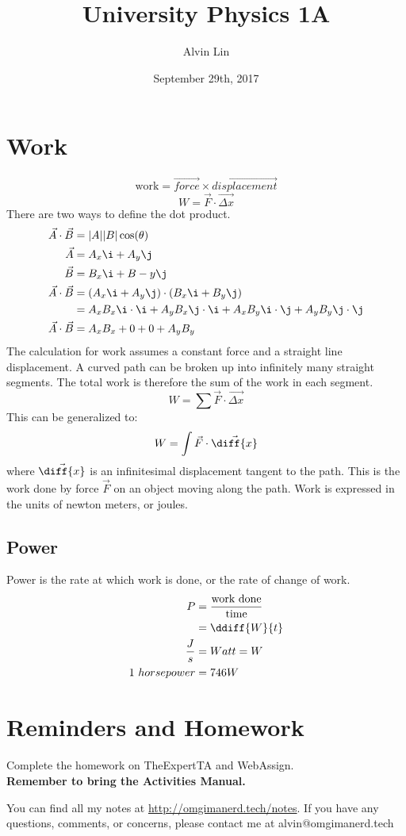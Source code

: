 \documentclass{math}
\title{University Physics 1A}
\author{Alvin Lin}
\date{September 29th, 2017}
\begin{document}
\maketitle

\section*{Work}
\[ \text{work} = \overrightarrow{force}\times\overrightarrow{displacement} \]
\[ W = \vec{F}\cdot\overrightarrow{\Delta x} \]
There are two ways to define the dot product.
\begin{align*}
  \vec{A}\cdot\vec{B} &= |A||B|\cos(\theta) \\
  \vec{A} &= A_x\i+A_y\j \\
  \vec{B} &= B_x\i+B-y\j \\
  \vec{A}\cdot\vec{B} &= (A_x\i+A_y\j)\cdot(B_x\i+B_y\j) \\
  &= A_xB_x\i\cdot\i+A_yB_x\j\cdot\i+A_xB_y\i\cdot\j+A_yB_y\j\cdot\j \\
  \vec{A}\cdot\vec{B} &= A_xB_x+0+0+A_yB_y
\end{align*}
The calculation for work assumes a constant force and a straight line
displacement. A curved path can be broken up into infinitely many straight
segments. The total work is therefore the sum of the work in each segment.
\[ W = \sum{\vec{F}\cdot\overrightarrow{\Delta x}} \]
This can be generalized to:
\[ W = \int\vec{F}\cdot\vec{\diff{x}} \]
where \( \vec{\diff{x}} \) is an infinitesimal displacement tangent to the
path. This is the work done by force \( \vec{F} \) on an object moving along
the path. Work is expressed in the units of newton meters, or joules.

\subsection*{Power}
Power is the rate at which work is done, or the rate of change of work.
\begin{align*}
  P &= \frac{\text{work done}}{\text{time}} \\
  &= \ddiff{W}{t} \\
  \frac{J}{s} &= Watt = W \\
  1~horsepower &= 746W
\end{align*}

\section*{Reminders and Homework}
Complete the homework on TheExpertTA and WebAssign. \\
\textbf{Remember to bring the Activities Manual.} \\

\begin{center}
  You can find all my notes at \url{http://omgimanerd.tech/notes}. If you have
  any questions, comments, or concerns, please contact me at
  alvin@omgimanerd.tech
\end{center}
\end{document}
